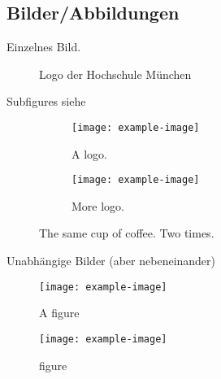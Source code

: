 \subsection{Bilder/Abbildungen}\label{subsec:abbildungen}
	
Einzelnes Bild.\autocite{higgins1996activation}
	
\begin{figure}[H]
	\centering
	\begin{minipage}{0.6\textwidth}
		\centering
	\end{minipage}
	\caption{Logo der Hochschule München}
  	\label{fig:logo}
\end{figure}
	
Subfigures siehe 
	
\begin{figure}[H]
  	\centering
  	\begin{subfigure}[b]{0.4\textwidth}
    	\texttt{[image: example-image]}
    	\caption{A logo.}
  	\end{subfigure}
  	\begin{subfigure}[b]{0.4\textwidth}
    	\texttt{[image: example-image]}
    	\caption{More logo.}
  	\end{subfigure}
  	\caption{The same cup of coffee. Two times.}
  	\label{fig:coffee}
\end{figure}
	
Unabhängige Bilder (aber nebeneinander)
	
\begin{figure}[H]
	\centering
	\begin{minipage}{.5\textwidth}
  		\centering
  		\texttt{[image: example-image]}
  		\caption{A figure}
  		\label{fig:test1}
	\end{minipage}%
	\begin{minipage}{.5\textwidth}
  		\centering
  		\texttt{[image: example-image]}
  		\caption{figure}
  		\label{fig:test2}
	\end{minipage}
\end{figure}